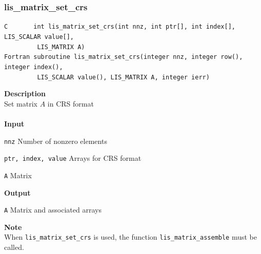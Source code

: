 \documentclass[a4paper]{article}
\newcommand{\namelistlabel}[1]{\mbox{#1}\hfill}
\newenvironment{namelist}[1]{%
 \begin{list}{}
  {\let\makelabel\namelistlabel
  \settowidth{\labelwidth}{#1}
  \setlength{\leftmargin}{1.1\labelwidth}}
}{%
\end{list}}
\begin{document}
  \subsubsection{lis\_matrix\_set\_crs}
\begin{screen}
\verb|C       int lis_matrix_set_crs(int nnz, int ptr[], int index[], LIS_SCALAR value[],|\\
\verb|         LIS_MATRIX A)|\\
\verb|Fortran subroutine lis_matrix_set_crs(integer nnz, integer row(), integer index(),|\\
\verb|         LIS_SCALAR value(), LIS_MATRIX A, integer ierr)|
\end{screen}
{\bf Description}\\
\indent
Set matrix $A$ in CRS format
\\ \\
\noindent
{\bf Input}
\begin{namelist}{XXXXXXXXXXXXXXXXXXXX}
\item[\tt nnz] Number of nonzero elements
\item[\tt ptr, index, value] Arrays for CRS format
\item[\tt A] Matrix
\end{namelist}
{\bf Output}
\begin{namelist}{XXXXXXXXXXXXXXXXXXXX}
\item[\tt A] Matrix and associated arrays
\end{namelist}
\noindent
{\bf Note}\\
\indent
When \verb|lis_matrix_set_crs| is used, 
the function \verb|lis_matrix_assemble| must be called. 
\end{document}
